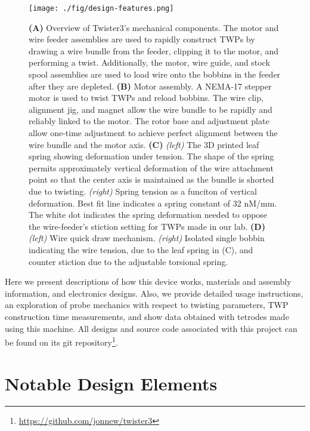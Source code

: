 \documentclass[11pt,a4paper]{article}
\begin{document}
\begin{figure}
\centering \texttt{[image: ./fig/design-features.png]}
\caption{\textbf{(A)} Overview of Twister3's mechanical components. The
    motor and wire feeder assemblies are used to rapidly construct TWPs by
    drawing a wire bundle from the feeder, clipping it to the motor, and
    performing a twist. Additionally, the motor, wire guide, and stock spool
    assemblies are used to load wire onto the bobbins in the feeder after they
    are depleted.
    \textbf{(B)} Motor assembly. A NEMA-17 stepper motor is used to twist TWPs
    and reload bobbins. The wire clip, alignment jig, and magnet allow the wire
    bundle to be rapidly and reliably linked to the motor. The rotor base and
    adjustment plate allow one-time adjustment to achieve perfect alignment
    between the wire bundle and the motor axis.
    \textbf{(C)} \textit{(left)} The 3D printed leaf spring showing deformation
    under tension. The shape of the spring permits approximately vertical
    deformation of the wire attachment point so that the center axis is
    maintained as the bundle is shorted due to twisting. \textit{(right)}
    Spring tension as a funciton of vertical deformation. Best fit line
    indicates a spring constant of 32 nM/mm. The white dot indicates the spring deformation
    needed to oppose the wire-feeder's stiction setting for TWPs made in our lab.
    \textbf{(D)} \textit{(left)} Wire quick draw mechanism. \textit{(right)} Isolated
    single bobbin indicating the wire tension, due to the leaf spring in (C),
    and counter stiction due to the adjustable torsional spring.}
\label{f:design-features}
\end{figure}

Here we present descriptions of how this device works, materials and assembly
information, and electronics designs. Also, we provide detailed usage
instructions, an exploration of probe mechanics with respect to twisting
parameters, TWP construction time measurements, and show data obtained with
tetrodes made using this machine. All designs and source code associated with
this project can be found on its git
repository\footnote{\url{https://github.com/jonnew/twister3}}.

\section{Notable Design Elements}
\end{document}
